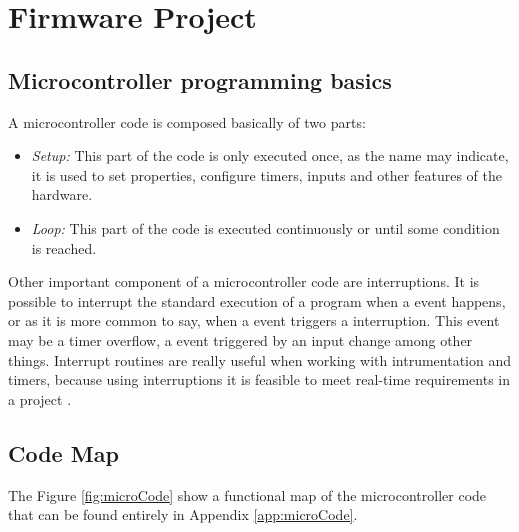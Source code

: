 \chapter{Firmware Project}\label{ch:software-project}

	\section{Microcontroller programming basics}\label{ssec:microcontroller-programming-basics}
		A microcontroller code is composed basically of two parts:
		
		\begin{itemize}
			\item \textit{Setup: } This part of the code is only executed once, as the name may indicate, it is used to set properties, configure timers, inputs and other features of the hardware.
			\item \textit{Loop: } This part of the code is executed continuously or until some condition is reached. 
		\end{itemize}
		
		\par
		
		Other important component of a microcontroller code are interruptions. It is possible to interrupt the standard execution of a program when a event happens, or as it is more common to say, when a event triggers a interruption. This event may be a timer overflow, a event triggered by an input change among other things. Interrupt routines are really useful when working with intrumentation and timers, because using interruptions it is feasible to meet real-time requirements in a project \cite{mukaro1999microcontroller}.
		
	\section{Code Map}\label{sec:microcontroller-code-map}
	
	The Figure \ref{fig:microCode} show a functional map of the microcontroller code that can be found entirely in Appendix \ref{app:microCode}.
	
